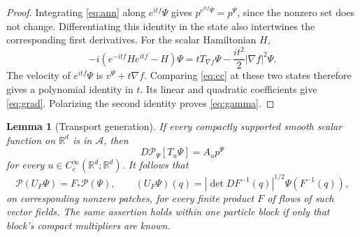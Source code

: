 \documentclass[11pt]{article}
\numberwithin{equation}{section}
\newtheorem{lemma}[lemma]{Lemma}
\theoremstyle{definition}
\newcommand{\R}{\mathbb R}
\newcommand{\Cc}{C_c^\infty}
\newcommand{\Pcal}{\mathcal P}
\newcommand{\Acal}{\mathcal A}
\begin{document}
\begin{proof}
Integrating \eqref{eq:ann} along \(e^{itf}\Psi\) gives
\(p^{e^{itf}\Psi}=p^\Psi\), since the nonzero set does not change. Differentiating this identity in the state also intertwines the corresponding first derivatives. For the scalar Hamiltonian \(H\),
\[
 -i(e^{-itf}He^{itf}-H)\Psi
 =tT_{\nabla f}\Psi-\frac{it^2}{2}|\nabla f|^2\Psi.
\]
The velocity of \(e^{itf}\Psi\) is \(v^\Psi+t\nabla f\). Comparing \eqref{eq:cc} at these two states therefore gives a polynomial identity in \(t\). Its linear and quadratic coefficients give \eqref{eq:grad}. Polarizing the second identity proves \eqref{eq:gamma}.
\end{proof}

\begin{lemma}[Transport generation]\label{lem:transport}
If every compactly supported smooth scalar function on \(\R^d\) is in \(\Acal\), then
\begin{equation}\label{eq:cov-inf}
 D\Pcal_\Psi[T_u\Psi]=A_up^\Psi
\end{equation}
for every \(u\in\Cc(\R^d;\R^d)\). It follows that
\begin{equation}\label{eq:cov-fin}
 \Pcal(U_F\Psi)=F_*\Pcal(\Psi),\qquad
 (U_F\Psi)(q)=|\det DF^{-1}(q)|^{1/2}\Psi(F^{-1}(q)),
\end{equation}
on corresponding nonzero patches, for every finite product \(F\) of flows of such vector fields.
The same assertion holds within one particle block if only that block's compact multipliers are known.
\end{lemma}
\end{document}
